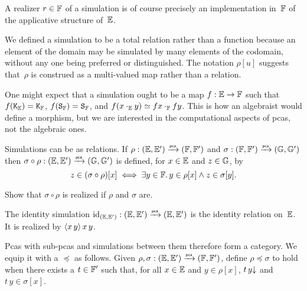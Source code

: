 A realizer $r \in \FF$ of a simulation is of course precisely an implementation in~$\FF$ of the applicative structure of~$\EE$.

We defined a simulation to be a total relation rather than a function because an element of the domain may be simulated by many elements of the codomain, without any one being preferred or distinguished. The notation $\rho[u]$ 
suggests that~$\rho$ is construed as a multi-valued map rather than a relation.

One might expect that a simulation ought to be a map $f : \EE \to \FF$ such that $f(\combK_\EE) = \combK_\FF$, $f(\combS_\FF) = \combS_\FF$, and $f (x \cdot_\EE y) \kleq f x \cdot_\FF f y$. This is how an algebraist would define a morphism, but we are interested in the computational aspects of pcas, not the algebraic ones.

%
%
%
Simulations can be  as relations.
If $\rho: (\EE, \subEE) \pcato (\FF, \subFF)$ and $\sigma: (\FF,
\subFF) \pcato (\GG, \subGG)$ then $\sigma \circ \rho: (\EE, \subEE)
\pcato (\GG, \subGG)$ is defined, for $x \in \EE$ and $z \in \GG$, by
%
\begin{equation*}
  z \in (\sigma \circ \rho)[x]
  \iff
  \some{y \in \FF} y \in \rho[x] \land z \in \sigma[y].
\end{equation*}

\begin{exercise}
  Show that $\sigma \circ \rho$ is realized if $\rho$ and $\sigma$ are.
\end{exercise}

The identity simulation $\id[(\EE, \subEE)]: (\EE,
\subEE) \pcato (\EE, \subEE)$ is the identity relation on~$\EE$. It is realized by $\pcalam{x\,y} x \, y$.

Pcas with sub-pcas and simulations between them therefore form a category. We equip it with a  $\preceq$ as follows.
%
%
%
%
%
Given $\rho, \sigma : (\EE, \subEE) \pcato (\FF, \subFF)$, define $\rho \preceq \sigma$ to hold when
there exists a  $t \in \subFF$ such that, for all $x \in \EE$ and $y \in \rho[x]$, $\defined{t \, y}$ and $t \, y \in \sigma[x]$.

